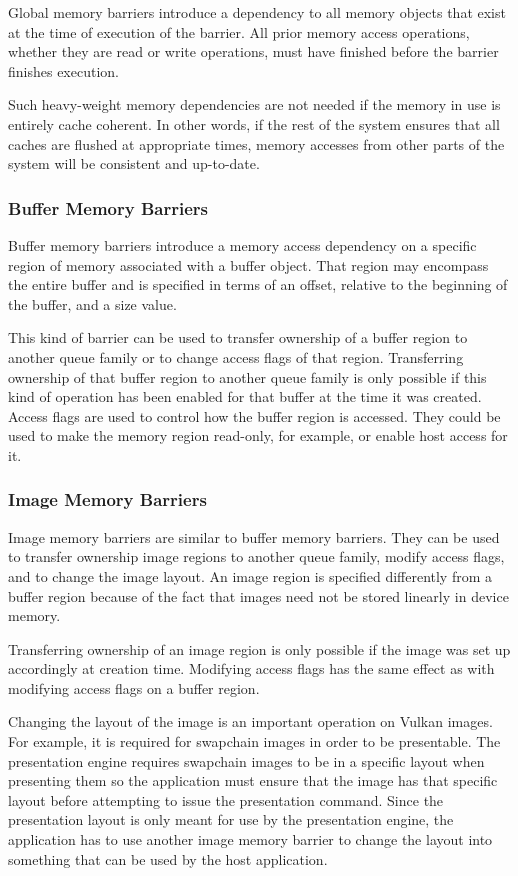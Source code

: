         Global memory barriers introduce a dependency to all memory objects that exist at the time of execution of the barrier. All prior memory access operations, whether they are read or write operations, must have finished before the barrier finishes execution.

        Such heavy-weight memory dependencies are not needed if the memory in use is entirely cache coherent. In other words, if the rest of the system ensures that all caches are flushed at appropriate times, memory accesses from other parts of the system will be consistent and up-to-date.

      \subsubsection{Buffer Memory Barriers}
        Buffer memory barriers introduce a memory access dependency on a specific region of memory associated with a buffer object. That region may encompass the entire buffer and is specified in terms of an offset, relative to the beginning of the buffer, and a size value.

        This kind of barrier can be used to transfer ownership of a buffer region to another queue family or to change access flags of that region. Transferring ownership of that buffer region to another queue family is only possible if this kind of operation has been enabled for that buffer at the time it was created. Access flags are used to control how the buffer region is accessed. They could be used to make the memory region read-only, for example, or enable host access for it.

      \subsubsection{Image Memory Barriers}
        Image memory barriers are similar to buffer memory barriers. They can be used to transfer ownership image regions to another queue family, modify access flags, and to change the image layout. An image region is specified differently from a buffer region because of the fact that images need not be stored linearly in device memory.

        Transferring ownership of an image region is only possible if the image was set up accordingly at creation time. Modifying access flags has the same effect as with modifying access flags on a buffer region.

        Changing the layout of the image is an important operation on Vulkan images. For example, it is required for swapchain images in order to be presentable. The presentation engine requires swapchain images to be in a specific layout when presenting them so the application must ensure that the image has that specific layout before attempting to issue the presentation command. Since the presentation layout is only meant for use by the presentation engine, the application has to use another image memory barrier to change the layout into something that can be used by the host application.
